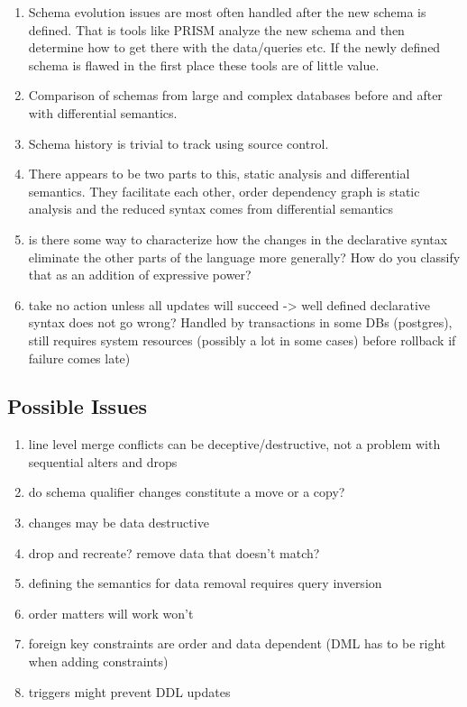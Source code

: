 \documentclass[12pt]{article}
\begin{document}
\begin{enumerate}
  \item Schema evolution issues are most often handled after the new schema is defined. That is tools like PRISM analyze the new schema and then determine how to get there with the data/queries etc. If the newly defined schema is flawed in the first place these tools are of little value.
  \item Comparison of schemas from large and complex databases before and after with differential semantics.
  \item Schema history is trivial to track using source control.
  \item There appears to be two parts to this, static analysis and differential semantics. They facilitate each other, order dependency graph is static analysis and the reduced syntax comes from differential semantics
  \item is there some way to characterize how the changes in the declarative syntax eliminate the other parts of the language more generally? How do you classify that as an addition of expressive power?
  \item take no action unless all updates will succeed -> well defined declarative syntax does not go wrong? Handled by transactions in some DBs (postgres), still requires system resources (possibly a lot in some cases) before rollback if failure comes late)
\end{enumerate}

\subsection{Possible Issues}

\begin{enumerate}
  \item line level merge conflicts can be deceptive/destructive, not a problem with sequential alters and drops
  \item do schema qualifier changes constitute a move or a copy?
  \item {} changes may be data destructive
  \item {} drop and recreate? remove data that doesn't match?
  \item {} defining the semantics for data removal requires query inversion
  \item order matters  will work  won't
  \item foreign key constraints are order and data dependent (DML has to be right when adding constraints)
  \item triggers might prevent DDL updates
\end{enumerate}
\end{document}
